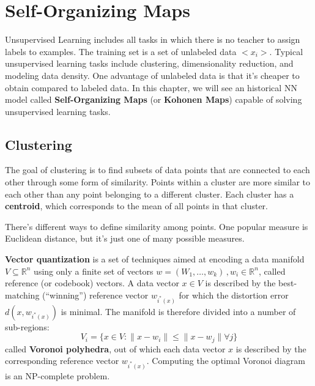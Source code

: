 \chapter{Self-Organizing Maps}

Unsupervised Learning includes all tasks in which there is no teacher to assign labels to examples. The training set is a set of unlabeled data $<x_i>$. Typical unsupervised learning tasks include clustering, dimensionality reduction, and modeling data density. One advantage of unlabeled data is that it's cheaper to obtain compared to labeled data. In this chapter, we will see an historical NN model called \textbf{Self-Organizing Maps} (or \textbf{Kohonen Maps}) capable of solving unsupervised learning tasks. 

\section{Clustering}

The goal of clustering is to find subsets of data points that are connected to each other through some form of similarity. Points within a cluster are more similar to each other than any point belonging to a different cluster. Each cluster has a \textbf{centroid}, which corresponds to the mean of all points in that cluster.

There's different ways to define similarity among points. One popular measure is Euclidean distance, but it's just one of many possible measures.

\textbf{Vector quantization} is a set of techniques aimed at encoding a data manifold $V \subseteq \mathbb{R}^n$ using only a finite set of vectors $w = (W_1,\dots,w_k) \,, w_i \in \mathbb{R}^n$, called reference (or codebook) vectors. A data vector $x \in V$ is described by the best-matching (``winning'') reference vector $w_{i^*(x)}$ for which the distortion error $d(x, w_{i^*(x)})$ is minimal. The manifold is therefore divided into a number of sub-regions:
\begin{equation*}
    V_i = \{ x \in V : \|x - w_i\| \leq \|x - w_j\| \forall j \}
\end{equation*}
called \textbf{Voronoi polyhedra}, out of which each data vector $x$ is described by the corresponding reference vector $w_{i^*(x)}$. Computing the optimal Voronoi diagram is an NP-complete problem.


